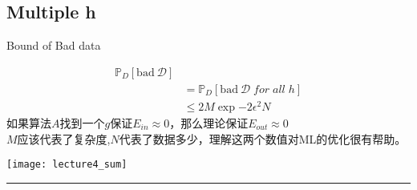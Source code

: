 \subsection{Multiple h} %
Bound of Bad data \par
\begin{align*}
\mathbb{P}_D[\text{bad} \ \mathcal{D}] \\
&= \mathbb{P}_D[\text{bad} \ \mathcal{D} \; for \; all \; h] \\
&\leq 2M\exp{-2\epsilon^2N}
\end{align*}
如果算法$A$找到一个$g$保证$E_{in} \approx 0$，那么理论保证$E_{out} \approx 0$ \\
$M$应该代表了复杂度,$N$代表了数据多少，理解这两个数值对ML的优化很有帮助。 
\begin{center}
\texttt{[image: lecture4\_sum]}
\end{center}
\noindent
{\color{RubineRed} \rule{\linewidth}{1mm} }
